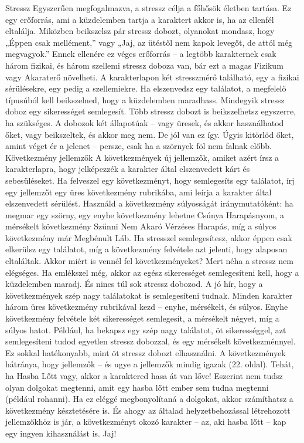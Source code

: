 \documentclass[oneside]{book}
\begin{document}
Stressz
Egyszerűen megfogalmazva, a stressz célja a főhősök életben tartása. Ez egy erőforrás, ami a küzdelemben tartja a karaktert akkor is, ha az ellenfél eltalálja. Miközben beikszelsz pár stressz dobozt, olyanokat mondasz, hogy „Éppen csak mellément,” vagy „Jaj, az ütéstől nem kapok levegőt, de attól még megvagyok.” Ennek ellenére ez véges erőforrás – a legtöbb karakternek csak három fizikai, és három szellemi stressz doboza van, bár ezt a magas Fizikum vagy Akaraterő növelheti.
A karakterlapon két stresszmérő található, egy a fizikai sérülésekre, egy pedig a szellemiekre. Ha elszenvedsz egy találatot, a megfelelő típusúból kell beikszelned, hogy a küzdelemben maradhass. Mindegyik stressz doboz egy sikerességet semlegesít. Több stressz dobozt is beikszelhetsz egyszerre, ha szükséges.
A dobozok két állapotúak – vagy üresek, és akkor használhatod őket, vagy beikszeltek, és akkor meg nem. De jól van ez így. Úgyis kitörlöd őket, amint véget ér a jelenet – persze, csak ha a szörnyek föl nem falnak előbb.
Következmény jellemzők
A következmények új jellemzők, amiket azért írsz a karakterlapra, hogy jelképezzék a karakter által elszenvedett kárt és sebesüléseket.
Ha felveszel egy következményt, hogy semlegesíts egy találatot, írj egy jellemzőt egy üres következmény rubrikába, ami leírja a karakter által elszenvedett sérülést. Használd a következmény súlyosságát iránymutatóként: ha megmar egy szörny, egy enyhe következmény lehetne Csúnya Harapásnyom, a mérsékelt következmény Szűnni Nem Akaró Vérzéses Harapás, míg a súlyos következmény már Megbénult Láb.
Ha stresszel semlegesítesz, akkor éppen csak elkerülsz egy találatot, míg a következmény felvétele azt jelenti, hogy alaposan eltaláltak. Akkor miért is vennél fel következményeket? Mert néha a stressz nem elégséges. Ha emlékszel még, akkor az egész sikerességet semlegesíteni kell, hogy a küzdelemben maradj. És nincs túl sok stressz dobozod. A jó hír, hogy a következmények szép nagy találatokat is semlegesíteni tudnak.
Minden karakter három üres következmény rubrikával kezd – enyhe, mérsékelt, és súlyos. Enyhe következmény felvétele két sikerességet semlegesít, a mérsékelt négyet, míg a súlyos hatot.
Például, ha bekapsz egy szép nagy találatot, öt sikerességgel, azt semlegesíteni tudod egyetlen stressz dobozzal, és egy mérsékelt következménnyel. Ez sokkal hatékonyabb, mint öt stressz dobozt elhasználni.
A következmények hátránya, hogy jellemzők – és ugye a jellemzők mindig igazak (22. oldal). Tehát, ha Hasba Lőtt vagy, akkor a karaktered hasa át van lőve! Eszerint nem tudsz olyan dolgokat megtenni, amit egy hasba lőtt ember sem tudna megtenni (például rohanni). Ha ez eléggé megbonyolítaná a dolgokat, akkor számíthatsz a következmény késztetésére is. És ahogy az általad helyzetbehozással létrehozott jellemzőkhöz is jár, a következményt okozó karakter – az, aki hasba lőtt – kap egy ingyen kihasználást is. Jaj!
\end{document}

